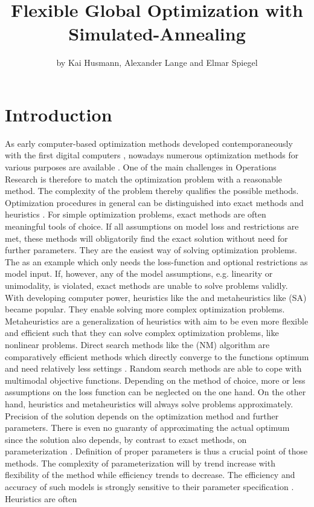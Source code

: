 \title{Flexible Global Optimization with Simulated-Annealing}
\author{by Kai Husmann, Alexander Lange and Elmar Spiegel}

\maketitle


\section{Introduction}
As early computer-based optimization methods developed contemporaneously with the first digital computers \citep{corana_1987}, nowadays numerous optimization methods for various purposes are available \citep{wegener_2005}. One of the main challenges in Operations Research is therefore to match the optimization problem with a reasonable method. The complexity of the problem thereby qualifies the possible methods. Optimization procedures in general can be distinguished into exact methods and heuristics \citep{kirkpatrick_1983}. For simple optimization problems, exact methods are often meaningful tools of choice. If all assumptions on model loss and restrictions are met, these methods will obligatorily find the exact solution without need for further parameters. They are the easiest way of solving optimization problems. The   \citep{dantzig_1959} as an example which only needs the loss-function and optional restrictions as model input. If, however, any of the model assumptions, e.g. linearity or unimodality, is violated, exact methods are unable to solve problems validly. With developing computer power, heuristics like the  \citep{clarke_1964} and metaheuristics like  (SA) \citep{kirkpatrick_1983} became popular. They enable solving more complex optimization problems. Metaheuristics are a generalization of heuristics with aim to be even more flexible and efficient \citep{blum_2003} such that they can solve complex optimization problems, like nonlinear problems. Direct search methods like the  (NM) algorithm are comparatively efficient methods which directly converge to the functions optimum and need relatively less settings \citep{geiger_1999}. Random search methods are able to cope with multimodal objective functions. Depending on the method of choice, more or less assumptions on the loss function can be neglected on the one hand. On the other hand, heuristics and metaheuristics will always solve problems approximately. Precision of the solution depends on the optimization method and further parameters. There is even no guaranty of approximating the actual optimum since the solution also depends, by contrast to exact methods, on parameterization \citep{blum_2003}. Definition of proper parameters is thus a crucial point of those methods. The complexity of parameterization will by trend increase with flexibility of the method while efficiency trends to decrease. The efficiency and accuracy of such models is strongly sensitive to their parameter specification \citep{corana_1987}. Heuristics are often 